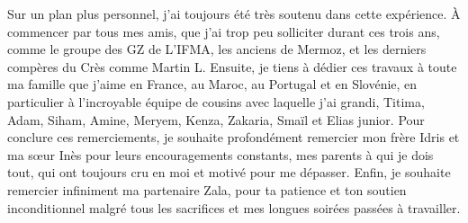 {Sur un plan plus personnel, j'ai toujours été très soutenu dans cette expérience. 
À commencer par tous mes amis, que j'ai trop peu solliciter durant ces trois ans, comme le groupe des GZ de L'IFMA, les anciens de Mermoz, et les derniers compères du Crès comme Martin L.
Ensuite, je tiens à dédier ces travaux à toute ma famille que j'aime en France, au Maroc, au Portugal et en Slovénie, en particulier à l'incroyable équipe de cousins avec laquelle j'ai grandi, 
Titima, Adam, Siham, Amine, Meryem, Kenza, Zakaria, Sma\"il et Elias junior. 
Pour conclure ces remerciements, je souhaite profondément remercier mon frère Idris et ma sœur Inès pour leurs encouragements constants, 
mes parents à qui je dois tout, qui ont toujours cru en moi et motivé pour me dépasser. 
Enfin, je souhaite remercier infiniment ma partenaire Zala, pour ta patience et ton soutien inconditionnel malgré tous les sacrifices et mes longues soirées passées à travailler. 




}

